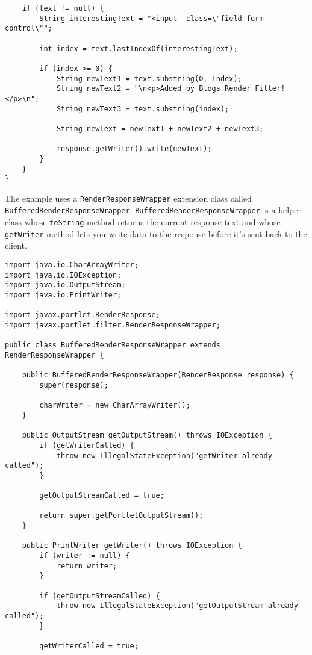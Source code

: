 \begin{enumerate}
\begin{verbatim}
    if (text != null) {
        String interestingText = "<input  class=\"field form-control\"";

        int index = text.lastIndexOf(interestingText);

        if (index >= 0) {
            String newText1 = text.substring(0, index);
            String newText2 = "\n<p>Added by Blogs Render Filter!</p>\n";
            String newText3 = text.substring(index);

            String newText = newText1 + newText2 + newText3;

            response.getWriter().write(newText);
        }
    }
}
\end{verbatim}

  The example uses a \texttt{RenderResponseWrapper} extension class
  called \texttt{BufferedRenderResponseWrapper}.
  \texttt{BufferedRenderResponseWrapper} is a helper class whose
  \texttt{toString} method returns the current response text and whose
  \texttt{getWriter} method lets you write data to the response before
  it's sent back to the client.

\begin{verbatim}
import java.io.CharArrayWriter;
import java.io.IOException;
import java.io.OutputStream;
import java.io.PrintWriter;

import javax.portlet.RenderResponse;
import javax.portlet.filter.RenderResponseWrapper;

public class BufferedRenderResponseWrapper extends RenderResponseWrapper {

    public BufferedRenderResponseWrapper(RenderResponse response) {
        super(response);

        charWriter = new CharArrayWriter();
    }

    public OutputStream getOutputStream() throws IOException {
        if (getWriterCalled) {
            throw new IllegalStateException("getWriter already called");
        }

        getOutputStreamCalled = true;

        return super.getPortletOutputStream();
    }

    public PrintWriter getWriter() throws IOException {
        if (writer != null) {
            return writer;
        }

        if (getOutputStreamCalled) {
            throw new IllegalStateException("getOutputStream already called");
        }

        getWriterCalled = true;


\end{verbatim}
\end{enumerate}
